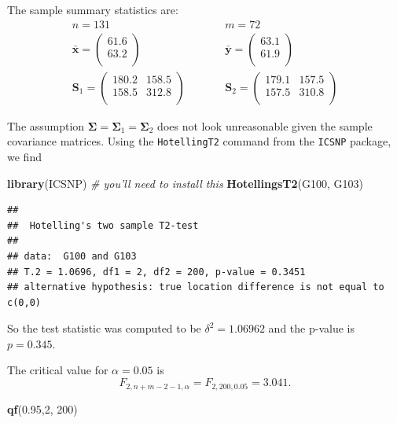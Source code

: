 \documentclass[]{book}
\newenvironment{Shaded}{\begin{snugshade}}{\end{snugshade}}
\newcommand{\CommentTok}[1]{\textcolor[rgb]{0.56,0.35,0.01}{\textit{#1}}}
\newcommand{\DecValTok}[1]{\textcolor[rgb]{0.00,0.00,0.81}{#1}}
\newcommand{\FloatTok}[1]{\textcolor[rgb]{0.00,0.00,0.81}{#1}}
\newcommand{\KeywordTok}[1]{\textcolor[rgb]{0.13,0.29,0.53}{\textbf{#1}}}
\newcommand{\NormalTok}[1]{#1}
\theoremstyle{definition}
\theoremstyle{definition}
\theoremstyle{definition}
\theoremstyle{remark}
\begin{document}
The sample summary statistics are:
\begin{eqnarray*}
n = 131 &\quad& m = 72 \\
\bar{\mathbf x} = \begin{pmatrix}61.6 \\63.2 \\\end{pmatrix}&\quad& \bar{\mathbf y}= \begin{pmatrix}63.1 \\61.9 \\\end{pmatrix}\\
\mathbf S_1 = \begin{pmatrix}180.2&158.5 \\158.5&312.8 \\\end{pmatrix} &\qquad& \mathbf S_2 = \begin{pmatrix}179.1&157.5 \\157.5&310.8 \\\end{pmatrix}
\end{eqnarray*}

The assumption \(\boldsymbol{\Sigma}= \boldsymbol{\Sigma}_1 = \boldsymbol{\Sigma}_2\) does not look unreasonable given the sample covariance matrices. Using the \texttt{HotellingT2} command from the \texttt{ICSNP} package, we find

\begin{Shaded}
\begin{Highlighting}[]
\KeywordTok{library}\NormalTok{(ICSNP) }\CommentTok{# you'll need to install this}
\KeywordTok{HotellingsT2}\NormalTok{(G100, G103)}
\end{Highlighting}
\end{Shaded}

\begin{verbatim}
## 
##  Hotelling's two sample T2-test
## 
## data:  G100 and G103
## T.2 = 1.0696, df1 = 2, df2 = 200, p-value = 0.3451
## alternative hypothesis: true location difference is not equal to c(0,0)
\end{verbatim}

So the test statistic was computed to be \(\delta^2 = 1.06962\) and the p-value is \(p= 0.345\).

The critical value for \(\alpha=0.05\) is
\[F_{2,n+m-2-1,\alpha} = F_{2,200,0.05} = 3.041.\]

\begin{Shaded}
\begin{Highlighting}[]
\KeywordTok{qf}\NormalTok{(}\FloatTok{0.95}\NormalTok{,}\DecValTok{2}\NormalTok{, }\DecValTok{200}\NormalTok{)}
\end{Highlighting}
\end{Shaded}
\end{document}
